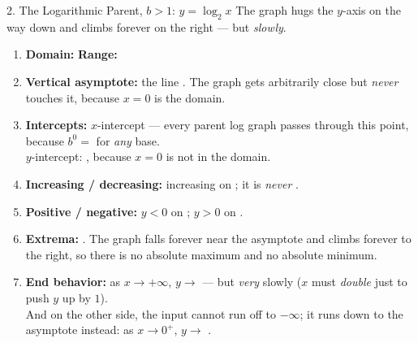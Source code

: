 \documentclass[10pt]{article}
\begin{document}
\begin{notesbox}{2. The Logarithmic Parent, $b>1$: $y=\log_2 x$}
\vspace{2pt}
The graph hugs the $y$-axis on the way down and climbs forever on the right --- but \emph{slowly}.
\begin{enumerate}[leftmargin=1.7em, itemsep=3pt]
  \item \textbf{Domain:}  \quad \textbf{Range:} \ans{$(-\infty,\infty)$}
  \item \textbf{Vertical asymptote:} the line . The graph gets arbitrarily close but
        \emph{never} touches it, because $x=0$ is  the domain.
  \item \textbf{Intercepts:} $x$-intercept  --- every parent log graph passes through
        this point, because $b^0=$  for \emph{any} base. \\
        $y$-intercept: , because $x=0$ is not in the domain.
  \item \textbf{Increasing / decreasing:} increasing on ; it is \emph{never}
        .
  \item \textbf{Positive / negative:} $y<0$ on ; \quad $y>0$ on .
  \item \textbf{Extrema:} . The graph falls forever near the asymptote and climbs
        forever to the right, so there is no absolute maximum and no absolute minimum.
  \item \textbf{End behavior:} as $x\to+\infty$, $y\to$ \ans{$+\infty$} --- but \emph{very} slowly
        ($x$ must \emph{double} just to push $y$ up by $1$). \\
        And on the other side, the input cannot run off to $-\infty$; it runs down to the asymptote
        instead: as $x\to 0^{+}$, $y\to$ \ans{$-\infty$}.
\end{enumerate}
\end{notesbox}
\end{document}
